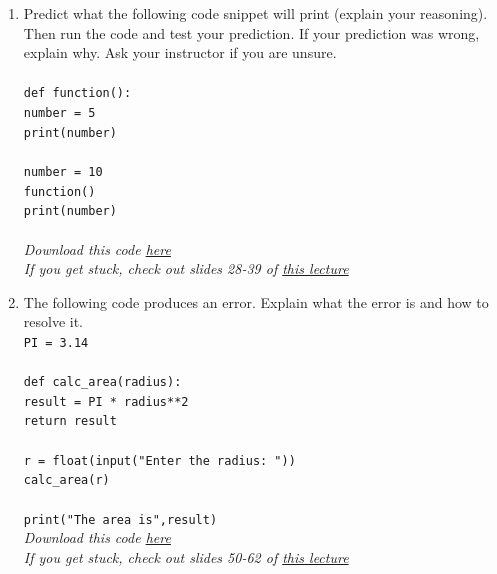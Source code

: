 \documentclass{article}
\begin{document}
\begin{enumerate}
	\item Predict what the following code snippet will print (explain your reasoning). Then run the code and test your prediction. If your prediction was wrong, explain why. Ask your instructor if you are unsure.\\ \\
	\texttt{def function():}\\
	\null\quad\texttt{number = 5}\\
	\null\quad\texttt{print(number)}\\
	\texttt{}\\
	\texttt{number = 10}\\
	\texttt{function()}\\
	\texttt{print(number)}\\
	\\
	\textit{Download this code \href{https://drive.google.com/file/d/1sQnFHCpxLDIN5dmPq6_MD5BBHTwZ7nWW/view?usp=sharing}{here}}\\
	\textit{If you get stuck, check out slides 28-39 of \href{https://drive.google.com/file/d/1JaWlzzRu-zYkWhKuV-HUDDozrkTxkhDF/view?usp=sharing}{this lecture}}
	\item The following code produces an error. Explain what the error is and how to resolve it.\\
	\texttt{PI = 3.14}\\
	\texttt{}\\
	\texttt{def calc\_area(radius):}\\
	\null\quad\texttt{result = PI * radius**2}\\
	\null\quad\texttt{return result}\\
	\texttt{}\\
	\texttt{r = float(input("Enter the radius: "))}\\
	\texttt{calc\_area(r)}\\
	\texttt{}\\
	\texttt{print("The area is",result)}\\
	\textit{Download this code \href{https://drive.google.com/file/d/1Cf0E09AdTFsikiw1ZwRMCrNBiXry5d4x/view?usp=sharing}{here}}\\
	\textit{If you get stuck, check out slides 50-62 of \href{https://drive.google.com/file/d/1JaWlzzRu-zYkWhKuV-HUDDozrkTxkhDF/view?usp=sharing}{this lecture}}
\end{enumerate}
\end{document}
